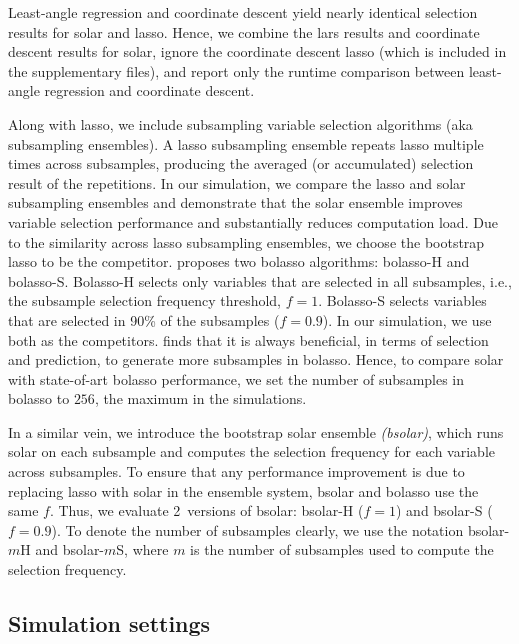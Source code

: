 \documentclass[11pt,authoryear]{elsarticle}
\begin{document}
Least-angle regression and coordinate descent yield nearly identical selection results for solar and lasso. Hence, we combine the lars results and coordinate descent results for solar, ignore the coordinate descent lasso (which is included in the supplementary files), and report only the runtime comparison between least-angle regression and coordinate descent.

Along with lasso, we include subsampling variable selection algorithms (aka subsampling ensembles). A lasso subsampling ensemble repeats lasso multiple times across subsamples, producing the averaged (or accumulated) selection result of the repetitions. In our simulation, we compare the lasso and solar subsampling ensembles and demonstrate that the solar ensemble improves variable selection performance and substantially reduces computation load. Due to the similarity across lasso subsampling ensembles, we choose the bootstrap lasso \citep{bach2008bolasso} to be the competitor. \citet{bach2008bolasso} proposes two bolasso algorithms: bolasso-H and bolasso-S. Bolasso-H selects only variables that are selected in all subsamples, i.e., the subsample selection frequency threshold, $f=1$. Bolasso-S selects variables that are selected in 90\% of the subsamples ($f=0.9$). In our simulation, we use both as the competitors. \citet{bach2008bolasso} finds that it is always beneficial, in terms of selection and prediction, to generate more subsamples in bolasso. Hence, to compare solar with state-of-art bolasso performance, we set the number of subsamples in bolasso to $256$, the maximum in the \citet{bach2008bolasso} simulations.

In a similar vein, we introduce the bootstrap solar ensemble \emph{(bsolar)}, which runs solar on each subsample and computes the selection frequency for each variable across subsamples. To ensure that any performance improvement is due to replacing lasso with solar in the ensemble system, bsolar and bolasso use the same $f$. Thus, we evaluate 2~versions of bsolar: bsolar-H ($f=1$) and bsolar-S ($f=0.9$). To denote the number of subsamples clearly, we use the notation bsolar-$m$H and bsolar-$m$S, where $m$ is the number of subsamples used to compute the selection frequency.

\subsection{Simulation settings}
\end{document}
